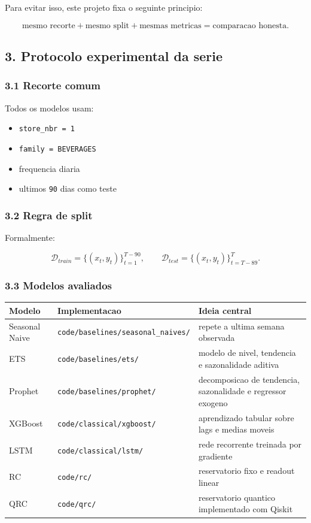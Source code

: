 \documentclass[12pt]{article}
\providecommand{\tightlist}{%
          \setlength{\itemsep}{0pt}\setlength{\parskip}{0pt}}
\begin{document}
Para evitar isso, este projeto fixa o seguinte principio:

\[
\text{mesmo recorte} + \text{mesmo split} + \text{mesmas metricas} = \text{comparacao honesta}.
\]

\subsection{3. Protocolo experimental da serie}\label{3-protocolo-experimental-da-serie}

\subsubsection{3.1 Recorte comum}\label{31-recorte-comum}

Todos os modelos usam:

\begin{itemize}
\tightlist
\item
  \texttt{store\_nbr\ =\ 1}
\item
  \texttt{family\ =\ BEVERAGES}
\item
  frequencia diaria
\item
  ultimos \texttt{90} dias como teste
\end{itemize}

\subsubsection{3.2 Regra de split}\label{32-regra-de-split}

Formalmente:

\[
\mathcal{D}_{train} = \{(x_t, y_t)\}_{t=1}^{T-90},
\qquad
\mathcal{D}_{test} = \{(x_t, y_t)\}_{t=T-89}^T.
\]

\subsubsection{3.3 Modelos avaliados}\label{33-modelos-avaliados}

\begin{longtable}[]{@{}lll@{}}
\toprule\noalign{}
Modelo & Implementacao & Ideia central \\
\midrule\noalign{}
\endhead
\bottomrule\noalign{}
\endlastfoot
Seasonal Naive & \texttt{code/baselines/seasonal\_naives/} & repete a ultima semana observada \\
ETS & \texttt{code/baselines/ets/} & modelo de nivel, tendencia e sazonalidade aditiva \\
Prophet & \texttt{code/baselines/prophet/} & decomposicao de tendencia, sazonalidade e regressor exogeno \\
XGBoost & \texttt{code/classical/xgboost/} & aprendizado tabular sobre lags e medias moveis \\
LSTM & \texttt{code/classical/lstm/} & rede recorrente treinada por gradiente \\
RC & \texttt{code/rc/} & reservatorio fixo e readout linear \\
QRC & \texttt{code/qrc/} & reservatorio quantico implementado com Qiskit \\
\end{longtable}
\end{document}
